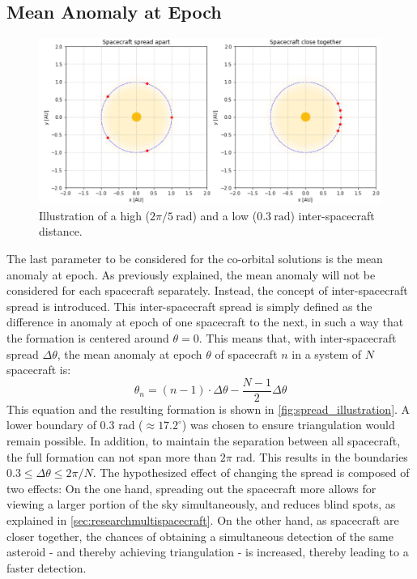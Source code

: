 \subsection{Mean Anomaly at Epoch}
\begin{figure}
 \centering
 \includegraphics[width=1.0\textwidth]{img/spread_illustration.png}
 \caption{Illustration of a high ($2\pi/5~\mathrm{rad}$) and a low ($0.3~\mathrm{rad}$) inter-spacecraft distance.}
 \label{fig:spread_illustration}
\end{figure}

The last parameter to be considered for the co-orbital solutions is the mean anomaly at epoch. As previously explained, the mean anomaly will not be considered for each spacecraft separately. Instead, the concept of inter-spacecraft spread is introduced. This inter-spacecraft spread is simply defined as the difference in anomaly at epoch of one spacecraft to the next, in such a way that the formation is centered around $\theta=0$. This means that, with inter-spacecraft spread $\Delta \theta$, the mean anomaly at epoch $\theta$ of spacecraft $n$ in a system of $N$ spacecraft is:
\begin{equation}
 \theta_n = (n-1) \cdot \Delta \theta - \frac{N-1}{2}\Delta \theta
\end{equation}
This equation and the resulting formation is shown in \autoref{fig:spread_illustration}. A lower boundary of 0.3 rad ($\approx 17.2^\circ$) was chosen to ensure triangulation would remain possible. In addition, to maintain the separation between all spacecraft, the full formation can not span more than $2\pi$ rad. This results in the boundaries $0.3 \leq \Delta \theta \leq 2\pi/N$. The hypothesized effect of changing the spread is composed of two effects: On the one hand, spreading out the spacecraft more allows for viewing a larger portion of the sky simultaneously, and reduces blind spots, as explained in \autoref{sec:researchmultispacecraft}. On the other hand, as spacecraft are closer together, the chances of obtaining a simultaneous detection of the same asteroid - and thereby achieving triangulation - is increased, thereby leading to a faster detection.\\

